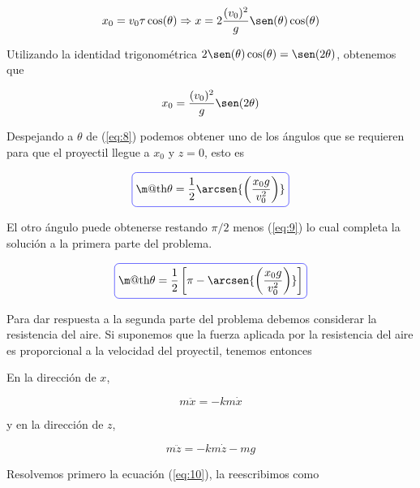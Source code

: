 \documentclass[a4paper,10pt]{article}
\makeatletter
\numberwithin{equation}{section}
\newcommand*{\boxcolor}{blue}
\renewcommand{\boxed}[1]{\textcolor{\boxcolor}{%
\tikz[baseline={([yshift=-1ex]current bounding box.center)}] \node [rectangle, minimum width=1ex,rounded corners,draw] {\normalcolor\m@th$\displaystyle#1$};}}
\makeatother
\begin{document}
\begin{equation*}
 x_0 = v_0 \tau \cos(\theta) \Rightarrow x = 2 \frac{(v_0)^2}{g} \sen(\theta)\cos(\theta)
\end{equation*}

Utilizando la identidad trigonométrica $2\sen(\theta)\cos(\theta) = \sen (2\theta)$,
obtenemos que

\begin{equation}
 x_0 = \frac{(v_0)^2}{g} \sen(2\theta)
 \label{eq:8}
\end{equation}

Despejando a $\theta$ de (\ref{eq:8}) podemos obtener uno de los ángulos que se 
requieren para que el proyectil llegue a $x_0$ y $z=0$, esto es


\begin{equation}
 \boxed{\theta = \frac{1}{2} \arcsen{\left(\frac{x_0 g}{v_0^2}\right)}}
 \label{eq:9}
\end{equation}

El otro ángulo puede obtenerse restando $\pi/2$ menos (\ref{eq:9}) lo 
cual completa la solución a la primera parte del problema.

\begin{equation}
 \boxed{\theta = \frac{1}{2}\left[\pi - \arcsen{\left(\frac{x_0 g}{v_0^2}\right)} \right]}
\end{equation}

\vspace{.3cm}

Para dar respuesta a la segunda parte del problema debemos considerar la 
resistencia del aire. Si suponemos que la fuerza aplicada por la resistencia 
del aire es proporcional a la velocidad del proyectil, tenemos entonces

En la dirección de $x$,

\begin{equation}
 m\ddot{x} = - k m \dot{x}
 \label{eq:10}
\end{equation}

y en la dirección de $z$,

\begin{equation}
 m \ddot{z} = - k m \dot{z} - mg
 \label{eq:11}
\end{equation}

Resolvemos primero la ecuación (\ref{eq:10}), la reescribimos como
\end{document}
